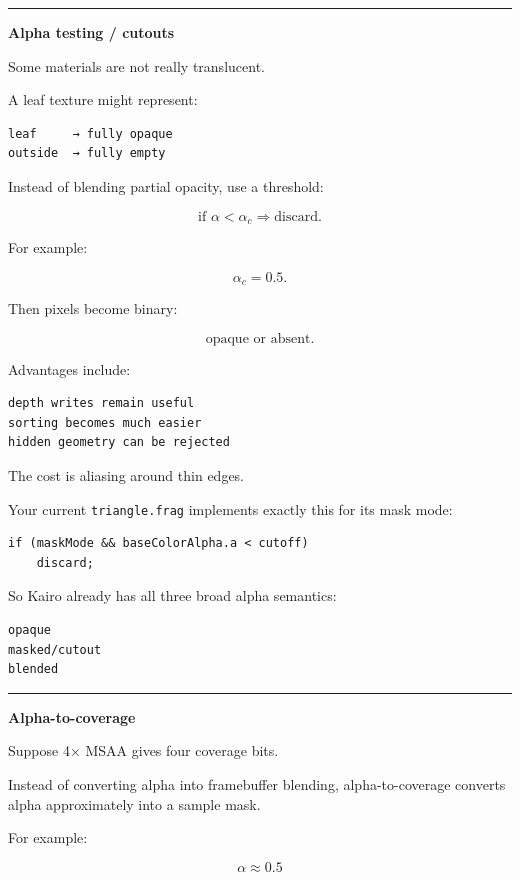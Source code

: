 \begin{center}\rule{0.5\linewidth}{0.5pt}\end{center}

\textbf{Alpha testing / cutouts}

Some materials are not really translucent.

A leaf texture might represent:

\begin{verbatim}
leaf     → fully opaque
outside  → fully empty
\end{verbatim}

Instead of blending partial opacity, use a threshold:

\[
\text{if }\alpha < \alpha_c
\Rightarrow
\text{discard}.
\]

For example:

\[
\alpha_c=0.5.
\]

Then pixels become binary:

\[
\text{opaque or absent}.
\]

Advantages include:

\begin{verbatim}
depth writes remain useful
sorting becomes much easier
hidden geometry can be rejected
\end{verbatim}

The cost is aliasing around thin edges.

Your current \texttt{triangle.frag} implements exactly this for its mask mode:

\begin{verbatim}
if (maskMode && baseColorAlpha.a < cutoff)
    discard;
\end{verbatim}

So Kairo already has all three broad alpha semantics:

\begin{verbatim}
opaque
masked/cutout
blended
\end{verbatim}

\begin{center}\rule{0.5\linewidth}{0.5pt}\end{center}

\textbf{Alpha-to-coverage}

Suppose 4× MSAA gives four coverage bits.

Instead of converting alpha into framebuffer blending, alpha-to-coverage converts alpha approximately into a sample mask.

For example:

\[
\alpha\approx0.5
\]

